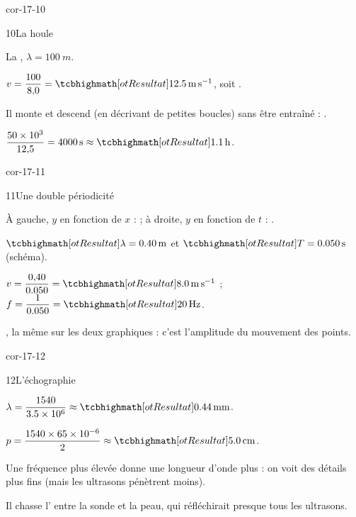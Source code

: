 \begin{blocLivre}{cor-17-10}
\begin{corrige}{10}{La houle}
\begin{questions}
\item La , $\lambda=\qty{100}{m}$.
\item $v=\dfrac{100}{8{,}0}=\res{\qty{12,5}{m.s^{-1}}}$, soit .
\item Il monte et descend (en décrivant de petites boucles) sans être entraîné : .
\item $\dfrac{\num{50e3}}{12{,}5}=\qty{4000}{s}\approx\res{\qty{1,1}{h}}$.
\end{questions}
\end{corrige}
\end{blocLivre}
\begin{blocLivre}{cor-17-11}
\begin{corrige}{11}{Une double périodicité}
\begin{questions}
\item À gauche, $y$ en fonction de $x$ :  ; à droite, $y$ en fonction de $t$ : .
\item $\res{\lambda=\qty{0,40}{m}}$ et $\res{T=\qty{0,050}{s}}$ (schéma).
\item $v=\dfrac{0{,}40}{\num{0,050}}=\res{\qty{8,0}{m.s^{-1}}}$ ; $f=\dfrac{1}{\num{0,050}}=\res{\qty{20}{Hz}}$.
\item {}, la même sur les deux graphiques : c'est l'amplitude du mouvement des points.
\end{questions}
\end{corrige}
\end{blocLivre}
\begin{blocLivre}{cor-17-12}
\begin{corrige}{12}{L'échographie}
\begin{questions}
\item $\lambda=\dfrac{1540}{\num{3,5e6}}\approx\res{\qty{0,44}{mm}}$.
\item $p=\dfrac{1540\times\num{65e-6}}{2}\approx\res{\qty{5,0}{cm}}$.
\item Une fréquence plus élevée donne une longueur d'onde plus  : on voit des détails plus fins (mais les ultrasons pénètrent moins).
\item Il chasse l' entre la sonde et la peau, qui réfléchirait presque tous les ultrasons.
\end{questions}
\end{corrige}
\end{blocLivre}
